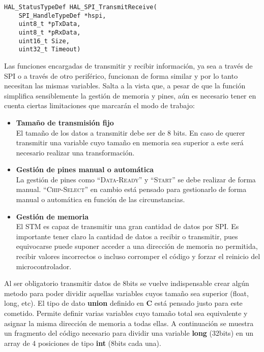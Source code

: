 \begin{lstlisting}[label=algoritmo:STM_Transmision_SPI,style = STM-code,frame=single,caption=Transmisión de datos a través de SPI con el STM]
HAL_StatusTypeDef HAL_SPI_TransmitReceive(
	SPI_HandleTypeDef *hspi,
 	uint8_t *pTxData, 
 	uint8_t *pRxData, 
 	uint16_t Size, 
	uint32_t Timeout)
\end{lstlisting}

Las funciones encargadas de transmitir y recibir información, ya sea a través de SPI o a través de otro periférico, funcionan de forma similar y por lo tanto necesitan las mismas variables. Salta a la vista que, a pesar de que la función simplifica sensiblemente la gestión de memoria y pines, aún es necesario tener en cuenta ciertas limitaciones que marcarán el modo de trabajo:
\begin{itemize}
\item \textbf{Tamaño de transmisión fijo}\\
El tamaño de los datos a transmitir debe ser de 8 bits. En caso de querer transmitir una variable cuyo tamaño en memoria sea superior a este será necesario realizar una transformación.
\item \textbf{Gestión de pines manual o automática}\\
La gestión de pines como ``\textsc{Data-Ready}'' y ``\textsc{Start}'' se debe realizar de forma manual. ``\textsc{Chip-Select}'' en cambio está pensado para gestionarlo de forma manual o automática en función de las circunstancias.
\item \textbf{Gestión de memoria}\\
El STM es capaz de transmitir una gran cantidad de datos por \acrshort{SPI}. Es importante tener claro la cantidad de datos a recibir o transmitir, pues equivocarse puede suponer acceder a una dirección de memoria no permitida, recibir valores incorrectos o incluso corromper el código y forzar el reinicio del microcontrolador.
\end{itemize}

Al ser obligatorio transmitir datos de 8bits se vuelve indispensable crear algún metodo para poder dividir aquellas variables cuyos tamaño sea superior (float, long, etc).
El tipo de dato \textbf{union} definido en \textbf{C} está pensado justo para este cometido. Permite definir varias variables cuyo tamaño total sea equivalente y asignar la misma dirección de memoria a todas ellas. A continuación se muestra un fragmento del código necesario para dividir una variable \textbf{long} (32bits) en un array de 4 posiciones de tipo \textbf{int} (8bits cada una).

